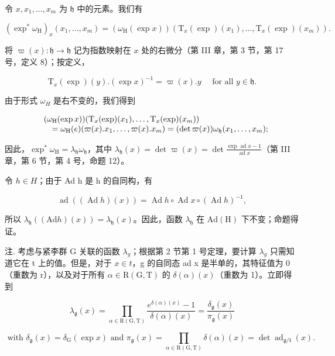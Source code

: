令 \(x, x_1, \ldots, x_m\) 为 \(\mathfrak{h}\) 中的元素。我们有

\[
(\exp^ {*} \omega_ {\mathrm{H}}) _ {x} (x _ {1}, \dots , x _ {m}) = (\omega_ {\mathrm{H}} (\exp x)) (\mathrm{T} _ {x} (\exp) (x _ {1}), \dots , \mathrm{T} _ {x} (\exp) (x _ {m})).
\]

将 \(\varpi(x) : \mathfrak{h} \to \mathfrak{h}\) 记为指数映射在 \(x\) 处的右微分（第 III 章，第 3 节，第 17 号，定义 8）；按定义，

\[
\mathrm{T} _ {x} (\exp) (y). (\exp x) ^ {- 1} = \varpi (x). y \quad \text { for   all } y \in \mathfrak {h}.
\]

由于形式 \(\omega_{H}\) 是右不变的，我们得到

\[
\begin{array}{r l} & (\omega_ {\mathrm{H}} (\exp x)) (\mathrm{T} _ {x} (\exp) (x _ {1}), \ldots , \mathrm{T} _ {x} (\exp) (x _ {m})) \\ & \quad = \omega_ {\mathrm{H}} (e) (\varpi (x). x _ {1}, \ldots , \varpi (x). x _ {m}) = (\det \varpi (x)) \omega_ {\mathfrak {h}} (x _ {1}, \ldots , x _ {m}); \end{array}
\]

因此，\(\exp^{*}\omega_{\mathrm{H}} = \lambda_{\mathfrak{h}}\omega_{\mathfrak{h}}\)，其中 \(\lambda_{\mathfrak{h}}(x) = \det \varpi(x) = \det \frac{\exp\operatorname{ad} x - 1}{\operatorname{ad} x}\)（第 III 章，第 6 节，第 4 号，命题 12）。

令 \(h \in H\)；由于 Ad h 是 h 的自同构，有

\[
\operatorname{ad} \left((\operatorname{Ad} h) (x)\right) = \operatorname{Ad} h \circ \operatorname{Ad} x \circ (\operatorname{Ad} h) ^ {- 1},
\]

所以 \(\lambda_{\mathfrak{h}}((\mathrm{Ad}h)(x)) = \lambda_{\mathfrak{h}}(x)\)。因此，函数 \(\lambda_{\mathfrak{h}}\) 在 \(\mathrm{Ad(H)}\) 下不变；命题得证。

注. 考虑与紧李群 G 关联的函数 \(\lambda_{g}\)；根据第 2 节第 1 号定理，要计算 \(\lambda_{g}\) 只需知道它在 t 上的值。但是，对于 \(x \in t\)，g 的自同态 ad x 是半单的，其特征值为 0（重数为 r），以及对于所有 \(\alpha \in \mathrm{R}(\mathrm{G}, \mathrm{T})\) 的 \(\delta(\alpha)(x)\)（重数为 1）。立即得到

\[
\lambda_ {\mathfrak {g}} (x) = \prod_ {\alpha \in \mathrm{R} (\mathrm{G}, \mathrm{T})} \frac {e ^ {\delta (\alpha) (x)} - 1}{\delta (\alpha) (x)} = \frac {\delta_ {\mathfrak {g}} (x)}{\pi_ {\mathfrak {g}} (x)}\tag{11}
\]

\[
\text { with } \delta_ {\mathfrak {g}} (x) = \delta_ {\mathrm{G}} (\exp x) \text { and } \pi_ {\mathfrak {g}} (x) = \prod_ {\alpha \in \mathrm{R} (\mathrm{G}, \mathrm{T})} \delta (\alpha) (x) = \det \operatorname{ad} _ {\mathfrak {g} / \mathfrak {t}} (x).
\]


